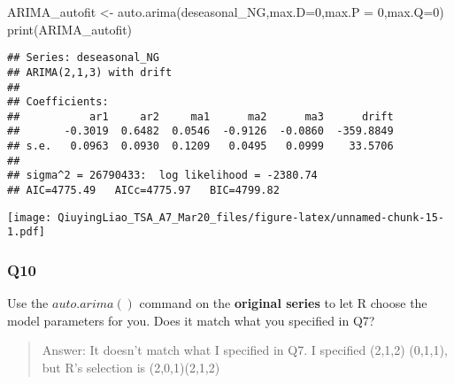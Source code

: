 \documentclass[
]{article}
\newenvironment{Shaded}{\begin{snugshade}}{\end{snugshade}}
\newcommand{\AttributeTok}[1]{\textcolor[rgb]{0.77,0.63,0.00}{#1}}
\newcommand{\DecValTok}[1]{\textcolor[rgb]{0.00,0.00,0.81}{#1}}
\newcommand{\FunctionTok}[1]{\textcolor[rgb]{0.00,0.00,0.00}{#1}}
\newcommand{\NormalTok}[1]{#1}
\newcommand{\OtherTok}[1]{\textcolor[rgb]{0.56,0.35,0.01}{#1}}
\newcommand{\SpecialCharTok}[1]{\textcolor[rgb]{0.00,0.00,0.00}{#1}}
\begin{document}
\begin{Shaded}
\begin{Highlighting}[]
\NormalTok{ARIMA\_autofit }\OtherTok{\textless{}{-}} \FunctionTok{auto.arima}\NormalTok{(deseasonal\_NG,}\AttributeTok{max.D=}\DecValTok{0}\NormalTok{,}\AttributeTok{max.P =} \DecValTok{0}\NormalTok{,}\AttributeTok{max.Q=}\DecValTok{0}\NormalTok{)}
\FunctionTok{print}\NormalTok{(ARIMA\_autofit)}
\end{Highlighting}
\end{Shaded}

\begin{verbatim}
## Series: deseasonal_NG 
## ARIMA(2,1,3) with drift 
## 
## Coefficients:
##           ar1     ar2     ma1      ma2      ma3      drift
##       -0.3019  0.6482  0.0546  -0.9126  -0.0860  -359.8849
## s.e.   0.0963  0.0930  0.1209   0.0495   0.0999    33.5706
## 
## sigma^2 = 26790433:  log likelihood = -2380.74
## AIC=4775.49   AICc=4775.97   BIC=4799.82
\end{verbatim}

\begin{Shaded}
\end{Shaded}

\texttt{[image: QiuyingLiao\_TSA\_A7\_Mar20\_files/figure-latex/unnamed-chunk-15-1.pdf]}

\hypertarget{q10}{%
\subsubsection{Q10}\label{q10}}

Use the \(auto.arima()\) command on the \textbf{original series} to let
R choose the model parameters for you. Does it match what you specified
in Q7?

\begin{quote}
Answer: It doesn't match what I specified in Q7. I specified (2,1,2)
(0,1,1), but R's selection is (2,0,1)(2,1,2)
\end{quote}
\end{document}
